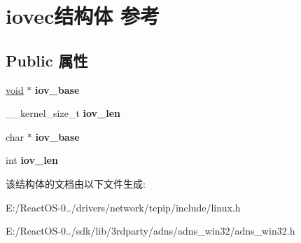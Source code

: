 \hypertarget{structiovec}{}\section{iovec结构体 参考}
\label{structiovec}
\subsection*{Public 属性}
\begin{DoxyCompactItemize}
\item 
\mbox{\label{structiovec_a07aeddeccf80f14520fdd7ef0759442b}} 
\hyperlink{interfacevoid}{void} $\ast$ {\bfseries iov\+\_\+base}
\item 
\mbox{\label{structiovec_a159601b23cf7b8acf5bbeb7a99f2113c}} 
\+\_\+\+\_\+kernel\+\_\+size\+\_\+t {\bfseries iov\+\_\+len}
\item 
\mbox{\label{structiovec_a3bf8362ea78c802fc659a3dbf1aef679}} 
char $\ast$ {\bfseries iov\+\_\+base}
\item 
\mbox{\label{structiovec_a6455104cf6c062bd4402c480e86626f2}} 
int {\bfseries iov\+\_\+len}
\end{DoxyCompactItemize}


该结构体的文档由以下文件生成\+:\begin{DoxyCompactItemize}
\item 
E\+:/\+React\+O\+S-\/0../drivers/network/tcpip/include/linux.\+h\item 
E\+:/\+React\+O\+S-\/0../sdk/lib/3rdparty/adns/adns\+\_\+win32/adns\+\_\+win32.\+h\end{DoxyCompactItemize}
